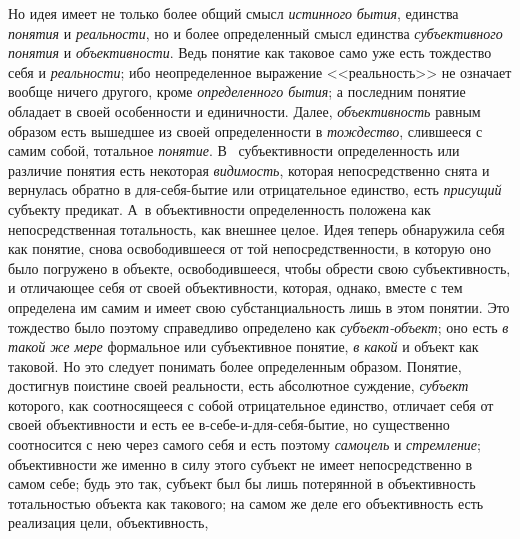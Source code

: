 Но идея имеет не только более общий смысл
{\em истинного}
{\em бытия}, единства
{\em понятия} и
{\em реальности}, но и
более определенный смысл единства
{\em субъективного понятия}
и {\em объективности}.
Ведь понятие как таковое само уже есть тождество себя и
{\em реальности}; ибо
неопределенное выражение <<реальность>> не означает вообще ничего другого,
кроме {\em определенного бытия};
а последним понятие обладает в своей особенности и
единичности. Далее, {\em объективность}
равным образом есть вышедшее из своей определенности в
{\em тождество}, слившееся с самим собой, тотальное
{\em понятие}. В~ субъективности определенность или различие понятия
есть некоторая {\em видимость}, которая
непосредственно снята и вернулась обратно в для-себя-бытие или
отрицательное единство, есть {\em присущий} субъекту
предикат. А~в объективности определенность положена как непосредственная
тотальность, как внешнее целое. Идея теперь обнаружила себя как понятие,
снова освободившееся от той непосредственности, в которую оно было
погружено в объекте, освободившееся, чтобы обрести свою субъективность, и
отличающее себя от своей объективности, которая, однако, вместе с тем
определена им самим и имеет свою субстанциальность лишь в этом понятии. Это
тождество было поэтому справедливо определено как
{\em субъект-объект};
оно есть {\em в такой же
мере} формальное или субъективное понятие,
{\em в какой} и объект
как таковой. Но это следует понимать более определенным образом. Понятие,
достигнув поистине своей реальности, есть абсолютное суждение,
{\em субъект} которого,
как соотносящееся с собой отрицательное единство, отличает
себя от своей объективности и есть ее в-себе-и-для-себя-бытие, но
существенно соотносится с нею через самого себя и есть поэтому
{\em самоцель} и
{\em стремление};
объективности же именно в силу этого субъект не имеет
непосредственно в самом себе; будь это так, субъект был бы лишь потерянной
в объективность тотальностью объекта как такового; на самом же деле его
объективность есть реализация цели, объективность,
